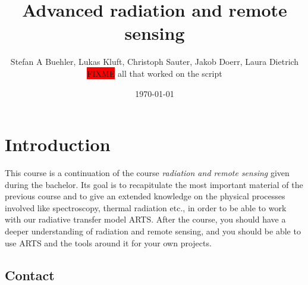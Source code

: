 
\usepackage{mathtools}
\usepackage{amssymb}  %
\renewcommand{\epsilon}{\varepsilon}  %

\usepackage{graphicx}  %
\usepackage{float}  %
\usepackage{floatflt}  %
\usepackage{subcaption}  %

\usepackage{enumerate}
\usepackage{textcomp}  %

\usepackage{framed}

\usepackage{chemfig}

\title{Advanced radiation and remote sensing}
\author{Stefan A Buehler, Lukas Kluft, Christoph Sauter, Jakob Doerr, Laura Dietrich  \colorbox{red}{FIXME} all that worked on
the script}
\date{\today}


\maketitle
\thispagestyle{empty}\pagestyle{empty}
\newpage
\tableofcontents
\newpage\pagestyle{fancy}



\section{Introduction}

This course is a continuation of the course \textit{radiation and
  remote sensing} given during the bachelor. Its goal is to
recapitulate the most important material of the previous course and to
give an extended knowledge on the physical processes involved like
spectroscopy, thermal radiation etc., in order to be able to work with
our radiative transfer model ARTS. After the course, you should have a
deeper understanding of radiation and remote sensing, and you should be
able to use ARTS and the tools around it for your own projects.

\subsection*{Contact}


